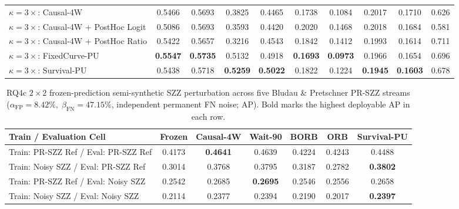 \documentclass[10pt,a4paper]{article}
\begin{document}
\begin{table}[!htbp]
\begin{tabular*}{\textwidth}{@{\extracolsep\fill}lccccccccc@{}}
\midrule
$\kappa=3\times$: Causal-4W & 0.5466 & 0.5693 & 0.3825 & 0.4465 & 0.1738 & 0.1084 & 0.2017 & 0.1710 & 0.626 \\
$\kappa=3\times$: Causal-4W + PostHoc Logit & 0.5086 & 0.5693 & 0.3593 & 0.4420 & 0.2020 & 0.1468 & 0.2018 & 0.1684 & 0.581 \\
$\kappa=3\times$: Causal-4W + PostHoc Ratio & 0.5422 & 0.5657 & 0.3216 & 0.4543 & 0.1842 & 0.1412 & 0.1993 & 0.1614 & 0.711 \\
$\kappa=3\times$: FixedCurve-PU & \textbf{0.5547} & \textbf{0.5735} & 0.5132 & 0.4918 & \textbf{0.1693} & \textbf{0.0973} & 0.1966 & 0.1654 & 0.696 \\
$\kappa=3\times$: Survival-PU & 0.5438 & 0.5718 & \textbf{0.5259} & \textbf{0.5022} & 0.1822 & 0.1224 & \textbf{0.1945} & \textbf{0.1603} & 0.678 \\
\bottomrule
\end{tabular*}
\end{table}

\begin{table}[!htbp]
\centering
\caption{RQ4c $2\times 2$ frozen-prediction semi-synthetic SZZ perturbation across five Bludau \& Pretschner PR-SZZ streams ($\alpha_{\mathrm{FP}}=8.42\%,\;\beta_{\mathrm{FN}}=47.15\%$, independent permanent FN noise; AP). Bold marks the highest deployable AP in each row.}
\label{tab:rq4d_szz}
\fontsize{7.5}{9.0}\selectfont
\setlength{\tabcolsep}{2.4pt}
\begin{tabular*}{\textwidth}{@{\extracolsep\fill}lcccccc@{}}
\toprule
\textbf{Train / Evaluation Cell} & \textbf{Frozen} & \textbf{Causal-4W} & \textbf{Wait-90} & \textbf{BORB} & \textbf{ORB} & \textbf{Survival-PU} \\
\midrule
Train: PR-SZZ Ref / Eval: PR-SZZ Ref & 0.4173 & \textbf{0.4641} & 0.4639 & 0.4224 & 0.4243 & 0.4488 \\
Train: Noisy SZZ / Eval: PR-SZZ Ref & 0.3014 & 0.3768 & 0.3795 & 0.3187 & 0.2782 & \textbf{0.3802} \\
Train: PR-SZZ Ref / Eval: Noisy SZZ & 0.2542 & 0.2685 & \textbf{0.2695} & 0.2546 & 0.2556 & 0.2658 \\
Train: Noisy SZZ / Eval: Noisy SZZ & 0.2114 & 0.2377 & 0.2394 & 0.2190 & 0.2017 & \textbf{0.2397} \\
\bottomrule
\end{tabular*}
\end{table}
\end{document}
